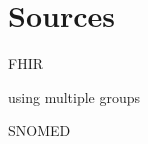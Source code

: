 \begin{comment}
\bibitem{SNOMED-FHIR}
``SNOMED CT -- FHIR ConceptMap Translate'' \newline
\url{https://github.com/IHTSDO/snowstorm/blob/master/docs/fhir-resources/concept-map.md}

=> IHTSDO / Snowstorm

\bibitem{I-MAGIC}
``I-MAGIC: SNOMED CT to ICD-10-CM Map'' \newline
\url{https://www.nlm.nih.gov/research/umls/mapping_projects/snomedct_to_icd10cm.html}

\bibitem{MAGPIE}
``MAGPIE: Map Assisted Generation of Procedure and Intervention Encoding'' \newline
\url{https://magpie.nlm.nih.gov/demo}


\end{comment}

\section{Sources}

FHIR \citep{braunstein2022health}

using multiple groups \citep{saripalle2019representing}

SNOMED \citep{icd10-to-snomed}

